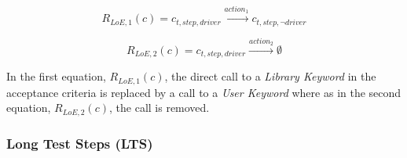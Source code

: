 \begin{itemize}
    \begin{equation*}
        R_{LoE, 1}(c) = c_{t, step, driver} \xrightarrow{action_1} c_{t, step, \neg driver}
    \end{equation*}
    
    \begin{equation*}
        R_{LoE, 2}(c) = c_{t, step, driver} \xrightarrow{action_2} \emptyset
    \end{equation*}
    
    In the first equation, $R_{LoE, 1}(c)$, the direct call to a \emph{Library Keyword} in the acceptance criteria is replaced by a call to a \emph{User Keyword} where as in the second equation, $R_{LoE, 2}(c)$, the call is removed.
\end{itemize}

\subsubsection{Long Test Steps (LTS)}


